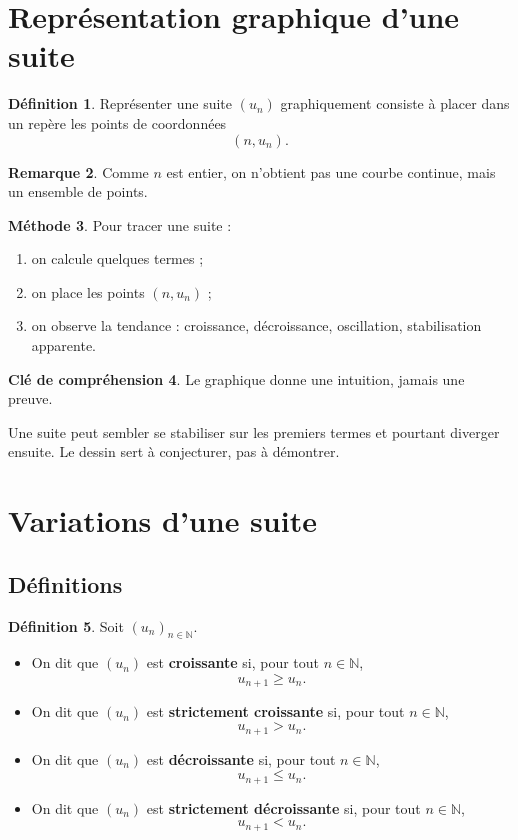 \documentclass[11pt,a4paper]{article}
\theoremstyle{definition}
\newtheorem{definition}{Définition}[section]
\newtheorem{remarque}[definition]{Remarque}
\newtheorem{methode}[definition]{Méthode}
\newtheorem{interpretation}[definition]{Clé de compréhension}
\theoremstyle{plain}
\theoremstyle{remark}
\newcommand{\N}{\mathbb{N}}
\newcommand{\uu}{(u_n)_{n\in\N}}
\begin{document}
\section{Représentation graphique d'une suite}

\begin{definition}
Représenter une suite $(u_n)$ graphiquement consiste à placer dans un repère les points de coordonnées
\[
(n,u_n).
\]
\end{definition}

\begin{remarque}
Comme $n$ est entier, on n'obtient pas une courbe continue, mais un ensemble de points.
\end{remarque}

\begin{methode}
Pour tracer une suite :
\begin{enumerate}[label=\arabic*.]
    \item on calcule quelques termes ;
    \item on place les points $(n,u_n)$ ;
    \item on observe la tendance : croissance, décroissance, oscillation, stabilisation apparente.
\end{enumerate}
\end{methode}

\begin{interpretation}
Le graphique donne une intuition, jamais une preuve.  

Une suite peut sembler se stabiliser sur les premiers termes et pourtant diverger ensuite. Le dessin sert à conjecturer, pas à démontrer.
\end{interpretation}

\section{Variations d'une suite}

\subsection{Définitions}

\begin{definition}
Soit $\uu$.
\begin{itemize}[leftmargin=0.8cm]
    \item On dit que $(u_n)$ est \textbf{croissante} si, pour tout $n\in\N$,
    \[
    u_{n+1}\geq u_n.
    \]
    \item On dit que $(u_n)$ est \textbf{strictement croissante} si, pour tout $n\in\N$,
    \[
    u_{n+1}>u_n.
    \]
    \item On dit que $(u_n)$ est \textbf{décroissante} si, pour tout $n\in\N$,
    \[
    u_{n+1}\leq u_n.
    \]
    \item On dit que $(u_n)$ est \textbf{strictement décroissante} si, pour tout $n\in\N$,
    \[
    u_{n+1}<u_n.
    \]
\end{itemize}
\end{definition}
\end{document}
